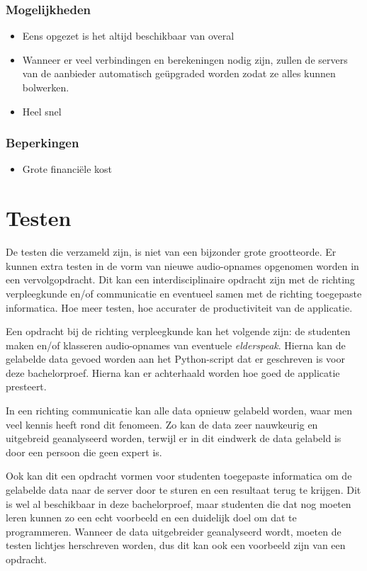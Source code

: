 \subsubsection{Mogelijkheden}
\begin{itemize}
    \item Eens opgezet is het altijd beschikbaar van overal
    \item Wanneer er veel verbindingen en berekeningen nodig zijn, zullen de servers van de aanbieder automatisch geüpgraded worden zodat ze alles kunnen bolwerken.
    \item Heel snel
\end{itemize}
\subsubsection{Beperkingen}
\begin{itemize}
    \item Grote financiële kost
\end{itemize}
\section{Testen}
De testen die verzameld zijn, is niet van een bijzonder grote grootteorde. Er kunnen extra testen in de vorm van nieuwe audio-opnames opgenomen worden in een vervolgopdracht. Dit kan een interdisciplinaire opdracht zijn met de richting verpleegkunde en/of communicatie en eventueel samen met de richting toegepaste informatica. Hoe meer testen, hoe accurater de productiviteit van de applicatie.

Een opdracht bij de richting verpleegkunde kan het volgende zijn: de studenten maken en/of klasseren audio-opnames van eventuele \textit{elderspeak}. Hierna kan de gelabelde data gevoed worden aan het Python-script dat er geschreven is voor deze bachelorproef. Hierna kan er achterhaald worden hoe goed de applicatie presteert.

In een richting communicatie kan alle data opnieuw gelabeld worden, waar men veel kennis heeft rond dit fenomeen. Zo kan de data zeer nauwkeurig en uitgebreid geanalyseerd worden, terwijl er in dit eindwerk de data gelabeld is door een persoon die geen expert is.

Ook kan dit een opdracht vormen voor studenten toegepaste informatica om de gelabelde data naar de server door te sturen en een resultaat terug te krijgen. Dit is wel al beschikbaar in deze bachelorproef, maar studenten die dat nog moeten leren kunnen zo een echt voorbeeld en een duidelijk doel om dat te programmeren. Wanneer de data uitgebreider geanalyseerd wordt, moeten de testen lichtjes herschreven worden, dus dit kan ook een voorbeeld zijn van een opdracht.
